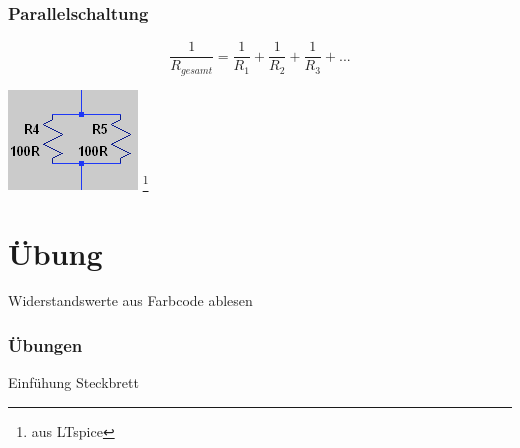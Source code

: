 \begin{frame}
    \frametitle{Parallelschaltung}
        $$\frac{1}{R_{gesamt}} = \frac{1}{R_1} + \frac{1}{R_2} + \frac{1}{R_3} + ...$$
        
	\begin{center}
        \includegraphics[width=.5\textwidth]{e04/Parallel.png}
        \footnote{\tiny aus LTspice}
    \end{center}
    

\end{frame}


\section*{Übung}

\begin{frame}

	\begin{center}
        Widerstandswerte aus Farbcode ablesen
    \end{center}
    
\end{frame}

\begin{frame}
  \frametitle{Übungen}
  \pause
  \begin{center}
    Einfühung Steckbrett
  \end{center}
\end{frame}

